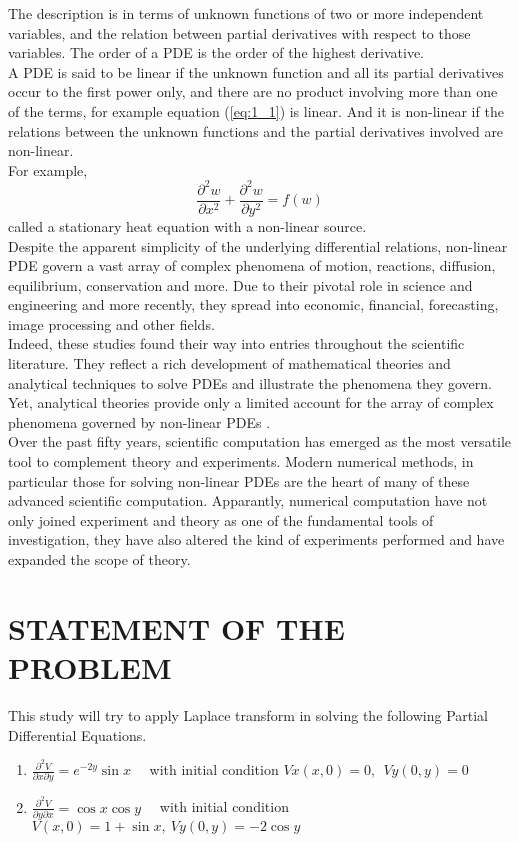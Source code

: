 \documentclass[11pt]{report}
\newcommand{\sps}{\\[0.2cm]}
\newcommand{\refn}[1]{(\ref{#1})}
\newcommand{\refx}[1]{\refn{eq:#1}}
\newcommand{\dsp}{\displaystyle}
\newcommand{\PDE}{PDE }
\newcommand{\PDEs}{PDEs }
\begin{document}
	The description is in terms of unknown functions of two or more independent variables, and the relation between partial derivatives with respect to those variables. The order of a \PDE is the order of the highest derivative.\\
	
	A \PDE is said to be linear if the unknown function and all its partial derivatives occur to the first power only, and there are no product involving more than one of the terms, for example equation \refx{1_1} is linear. And it is non-linear if the relations between the unknown functions and the partial derivatives involved are non-linear.\sps
	For example,
	\begin{equation}
		\frac{\partial^2w}{\partial x^2}+\frac{\partial^2w}{\partial y^2} = f(w)
		\label{eq:1_2}
	\end{equation}
	called a stationary heat equation with a non-linear source.\sps
	
	Despite the apparent simplicity of the underlying differential relations, non-linear \PDE govern a vast array of complex phenomena of motion, reactions, diffusion, equilibrium, conservation and more. Due to their pivotal role in science and engineering and more recently, they spread into economic, financial, forecasting, image processing and other fields.\\
	
	Indeed, these studies found their way into entries throughout the scientific literature. They reflect a rich development of mathematical theories and analytical techniques to solve \PDEs  and illustrate the phenomena they govern. Yet, analytical theories provide only a limited account for the array of complex phenomena governed by non-linear \PDEs.\\
	
	Over the past fifty years, scientific computation has emerged as the most versatile tool to complement theory and experiments. Modern numerical methods, in particular those for solving non-linear \PDEs are the heart of many of these advanced scientific computation. Apparantly, numerical computation have not only joined experiment and theory as one of the fundamental tools of investigation, they have also altered the kind of experiments performed and have expanded the scope of theory.
	
	\section{STATEMENT OF THE PROBLEM}
	This study will try to apply Laplace transform in solving the following Partial Differential Equations.\\
	\begin{enumerate}
		\item $\dsp \frac{\partial^2 V}{\partial x\partial y} = e^{-2y}\sin x$ ~~with initial condition $Vx(x,0)=0, ~~Vy(0,y) =0$
		\item $\dsp \frac{\partial^2 V}{\partial y \partial x}= \cos x \cos y$~~ with initial condition $V(x,0)=1+\sin x, ~ Vy(0,y)=-2\cos y$
	\end{enumerate}
\end{document}
